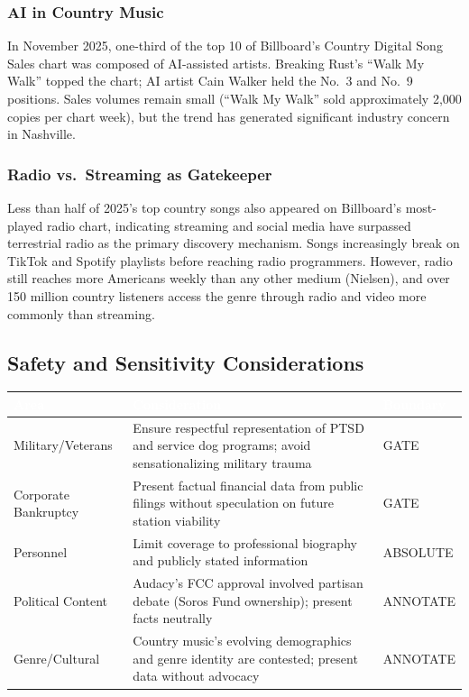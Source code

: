 \documentclass[11pt,letterpaper]{article}
\newcommand{\tableheader}[1]{\textbf{\sffamily\textcolor{white}{#1}}}
\begin{document}
\subsubsection{AI in Country Music}

In November 2025, one-third of the top 10 of Billboard's Country Digital Song Sales chart was composed of AI-assisted artists. Breaking Rust's ``Walk My Walk'' topped the chart; AI artist Cain Walker held the No.~3 and No.~9 positions. Sales volumes remain small (``Walk My Walk'' sold approximately 2,000 copies per chart week), but the trend has generated significant industry concern in Nashville.

\subsubsection{Radio vs.\ Streaming as Gatekeeper}

Less than half of 2025's top country songs also appeared on Billboard's most-played radio chart, indicating streaming and social media have surpassed terrestrial radio as the primary discovery mechanism. Songs increasingly break on TikTok and Spotify playlists before reaching radio programmers. However, radio still reaches more Americans weekly than any other medium (Nielsen), and over 150 million country listeners access the genre through radio and video more commonly than streaming.

\subsection{Safety and Sensitivity Considerations}

\begin{center}
\begin{tabularx}{\textwidth}{L{3cm}XC{2cm}}
\toprule
{}
\tableheader{Area} & \tableheader{Consideration} & \tableheader{Boundary} \\
\midrule
Military/Veterans & Ensure respectful representation of PTSD and service dog programs; avoid sensationalizing military trauma & GATE \\
Corporate Bankruptcy & Present factual financial data from public filings without speculation on future station viability & GATE \\
Personnel & Limit coverage to professional biography and publicly stated information & ABSOLUTE \\
Political Content & Audacy's FCC approval involved partisan debate (Soros Fund ownership); present facts neutrally & ANNOTATE \\
Genre/Cultural & Country music's evolving demographics and genre identity are contested; present data without advocacy & ANNOTATE \\
\bottomrule
\end{tabularx}
\end{center}
\end{document}
